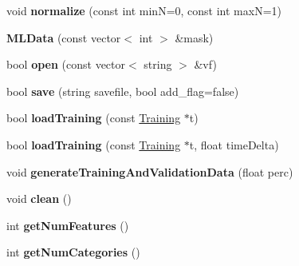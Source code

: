 \begin{DoxyCompactItemize}
\item 
\hypertarget{class_m_l_data_a0dbafa975f61f0c22ff91aa61a76c776}{void {\bfseries normalize} (const int min\-N=0, const int max\-N=1)}\label{class_m_l_data_a0dbafa975f61f0c22ff91aa61a76c776}

\item 
\hypertarget{class_m_l_data_abada8d81c2ec3c2cc7a2255dc7ea9a37}{{\bfseries M\-L\-Data} (const vector$<$ int $>$ \&mask)}\label{class_m_l_data_abada8d81c2ec3c2cc7a2255dc7ea9a37}

\item 
\hypertarget{class_m_l_data_a98dfa7ff0fa801bd27a1ef6c9bae5a4e}{bool {\bfseries open} (const vector$<$ string $>$ \&vf)}\label{class_m_l_data_a98dfa7ff0fa801bd27a1ef6c9bae5a4e}

\item 
\hypertarget{class_m_l_data_a6710827f90f4792c7cce2045fa62dc8a}{bool {\bfseries save} (string savefile, bool add\-\_\-flag=false)}\label{class_m_l_data_a6710827f90f4792c7cce2045fa62dc8a}

\item 
\hypertarget{class_m_l_data_a141c2774c2f40940083faaeff226875f}{bool {\bfseries load\-Training} (const \hyperlink{class_training}{Training} $\ast$t)}\label{class_m_l_data_a141c2774c2f40940083faaeff226875f}

\item 
\hypertarget{class_m_l_data_a1107ca6cb68a53bd757ae805877f5e23}{bool {\bfseries load\-Training} (const \hyperlink{class_training}{Training} $\ast$t, float time\-Delta)}\label{class_m_l_data_a1107ca6cb68a53bd757ae805877f5e23}

\item 
\hypertarget{class_m_l_data_a78eda93fdf296f99d61232fa5b706399}{void {\bfseries generate\-Training\-And\-Validation\-Data} (float perc)}\label{class_m_l_data_a78eda93fdf296f99d61232fa5b706399}

\item 
\hypertarget{class_m_l_data_a364682eec986213f575f80c9192df0e7}{void {\bfseries clean} ()}\label{class_m_l_data_a364682eec986213f575f80c9192df0e7}

\item 
\hypertarget{class_m_l_data_a597490a96a4e97829edd2ee659e2ffcf}{int {\bfseries get\-Num\-Features} ()}\label{class_m_l_data_a597490a96a4e97829edd2ee659e2ffcf}

\item 
\hypertarget{class_m_l_data_a38fe7db4f2dae1661064205e0a6878af}{int {\bfseries get\-Num\-Categories} ()}\label{class_m_l_data_a38fe7db4f2dae1661064205e0a6878af}


\end{DoxyCompactItemize}
